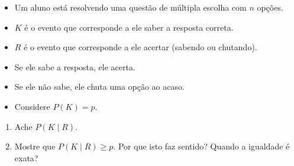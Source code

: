 \documentclass[
  11pt]{report}
\begin{document}
\begin{rmdbox}

\begin{itemize}
\item
  Um aluno está resolvendo uma questão de múltipla escolha com $n$ opções.
\item
  $K$ é o evento que corresponde a ele saber a resposta correta.
\item
  $R$ é o evento que corresponde a ele acertar (sabendo ou chutando).
\item
  Se ele sabe a resposta, ele acerta.
\item
  Se ele não sabe, ele chuta uma opção ao acaso.
\item
  Considere $P(K) = p$.
\end{itemize}

\begin{enumerate}
\def\labelenumi{(\alph{enumi})}
\item
  Ache $P(K \mid R)$.
\item
  Mostre que $P(K \mid R) \geq p$. Por que isto faz sentido? Quando a igualdade é exata?
\end{enumerate}

\end{rmdbox}
\end{document}
